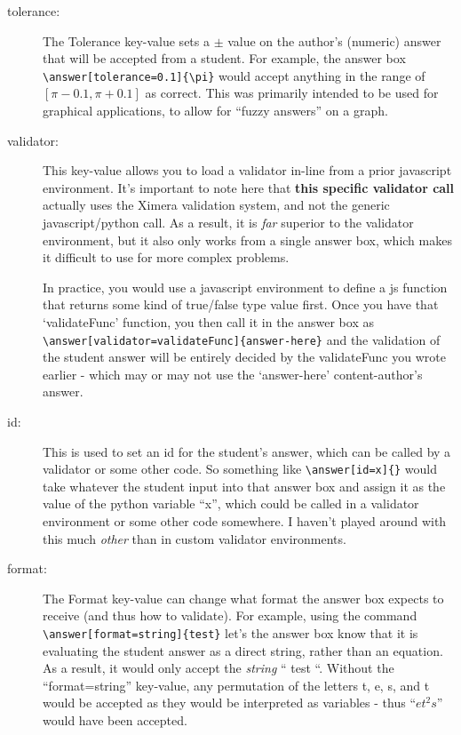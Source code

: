 \documentclass{ximera}
\begin{document}
        \begin{description}
            \item[tolerance:] The Tolerance key-value sets a $\pm$ value on the author's (numeric) answer that will be accepted from a student. For example, the answer box \verb|\answer[tolerance=0.1]{\pi}| would accept anything in the range of $[\pi-0.1,\pi+0.1]$ as correct. This was primarily intended to be used for graphical applications, to allow for ``fuzzy answers'' on a graph.
            
            \item[validator:] This key-value allows you to load a validator in-line from a prior javascript environment. It's important to note here that \textbf{this specific validator call} actually uses the Ximera validation system, and not the generic javascript/python call. As a result, it is \textit{far} superior to the validator environment, but it also only works from a single answer box, which makes it difficult to use for more complex problems. 
            
            In practice, you would use a javascript environment to define a js function that returns some kind of true/false type value first. Once you have that `validateFunc' function, you then call it in the answer box as \verb|\answer[validator=validateFunc]{answer-here}| and the validation of the student answer will be entirely decided by the validateFunc you wrote earlier - which may or may not use the `answer-here' content-author's answer.
            
            \item[id:] This is used to set an id for the student's answer, which can be called by a validator or some other code. So something like \verb|\answer[id=x]{}| would take whatever the student input into that answer box and assign it as the value of the python variable ``x'', which could be called in a validator environment or some other code somewhere. I haven't played around with this much \textit{other} than in custom validator environments.
            
            \item[format:] The Format key-value can change what format the answer box expects to receive (and thus how to validate). For example, using the command \verb|\answer[format=string]{test}| let's the answer box know that it is evaluating the student answer as a direct string, rather than an equation. As a result, it would only accept the \textit{string} `` test ``. Without the ``format=string'' key-value, any permutation of the letters t, e, s, and t would be accepted as they would be interpreted as variables - thus ``$et^2s$'' would have been accepted. 
            

\end{description}
\end{document}
